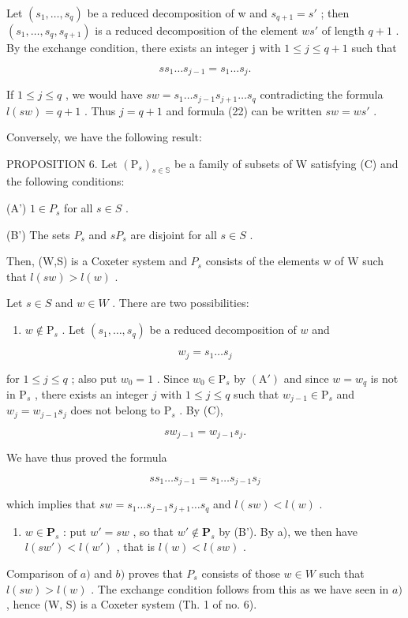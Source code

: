 Let \((s_{1},\ldots,s_{q})\) be a reduced decomposition of w and \(s_{q+1}=s'\) ; then \((s_{1},\ldots,s_{q},s_{q+1})\) is a reduced decomposition of the element \(ws'\) of length \(q+1\) . By the exchange condition, there exists an integer j with \(1\leqslant j\leqslant q+1\) such that

\[
s s _ {1} \dots s _ {j - 1} = s _ {1} \dots s _ {j}.\tag{22}
\]

If \(1 \leqslant j \leqslant q\) , we would have \(sw = s_1 \ldots s_{j-1}s_{j+1} \ldots s_q\) contradicting the formula \(l(sw) = q + 1\) . Thus \(j = q + 1\) and formula (22) can be written \(sw = ws'\) .

Conversely, we have the following result:

PROPOSITION 6. Let \((\mathrm{P}_s)_{s\in \mathbb{S}}\) be a family of subsets of W satisfying (C) and the following conditions:

(A') \(1 \in P_{s}\) for all \(s \in S\) .

(B') The sets \(P_{s}\) and \(sP_{s}\) are disjoint for all \(s \in S\) .

Then, (W,S) is a Coxeter system and \(P_{s}\) consists of the elements w of W such that \(l(sw) > l(w)\) .

Let \(s \in S\) and \(w \in W\) . There are two possibilities:

\begin{enumerate}
\def\labelenumi{\alph{enumi})}
\tightlist
\item
  \(w \notin \mathrm{P}_s\) . Let \((s_1, \ldots, s_q)\) be a reduced decomposition of \(w\) and
\end{enumerate}

\[
w _ {j} = s _ {1} \dots s _ {j}
\]

for \(1 \leqslant j \leqslant q\) ; also put \(w_0 = 1\) . Since \(w_0 \in \mathrm{P}_s\) by \((\mathrm{A}')\) and since \(w = w_q\) is not in \(\mathrm{P}_s\) , there exists an integer \(j\) with \(1 \leqslant j \leqslant q\) such that \(w_{j-1} \in \mathrm{P}_s\) and \(w_j = w_{j-1}s_j\) does not belong to \(\mathrm{P}_s\) . By (C),

\[
s w _ {j - 1} = w _ {j - 1} s _ {j}.
\]

We have thus proved the formula

\[
s s _ {1} \dots s _ {j - 1} = s _ {1} \dots s _ {j - 1} s _ {j}
\]

which implies that \(sw = s_1 \ldots s_{j-1}s_{j+1} \ldots s_q\) and \(l(sw) < l(w)\) .

\begin{enumerate}
\def\labelenumi{\alph{enumi})}
\setcounter{enumi}{1}
\tightlist
\item
  \(w \in \mathbf{P}_s\) : put \(w' = sw\) , so that \(w' \notin \mathbf{P}_s\) by (B'). By a), we then have \(l(sw') < l(w')\) , that is \(l(w) < l(sw)\) .
\end{enumerate}

Comparison of \(a)\) and \(b)\) proves that \(P_s\) consists of those \(w \in W\) such that \(l(sw) > l(w)\) . The exchange condition follows from this as we have seen in \(a)\) , hence (W, S) is a Coxeter system (Th. 1 of no. 6).

